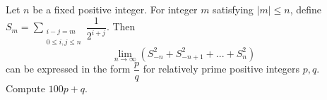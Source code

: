 Let $n$ be a fixed positive integer. For integer $m$ satisfying $|m| \le n$, define $S_m=\displaystyle\sum_{\substack{i-j=m \\0 \le i,j \le n}} \dfrac{1}{2^{i+j}}$. Then \[\lim_{n\to \infty} \left( S_{-n}^2 + S_{-n+1}^2 +... + S_n^2 \right)\] can be expressed in the form $\dfrac{p}{q}$ for relatively prime positive integers $p,q$. Compute $100p+q$.
